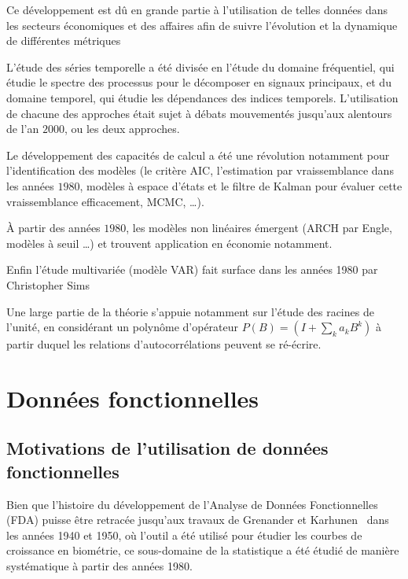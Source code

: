 Ce développement est dû en grande partie à l'utilisation de telles données dans les secteurs économiques et des affaires afin de suivre l'évolution et la dynamique de différentes métriques

L'étude des séries temporelle a été divisée en l'étude du domaine fréquentiel, qui étudie le spectre des processus pour le décomposer en signaux principaux, et du domaine temporel, qui étudie les dépendances des indices temporels. L'utilisation de chacune des approches était sujet à débats mouvementés jusqu'aux alentours de l'an $2000$, ou les deux approches. 

Le développement des capacités de calcul a été une révolution notamment pour l'identification des modèles (le critère AIC, l'estimation par vraissemblance dans les années $1980$, modèles à espace d'états et le filtre de Kalman pour évaluer cette vraissemblance efficacement, MCMC, \ldots).

À partir des années $1980$, les modèles non linéaires émergent (ARCH par Engle, modèles à seuil \ldots) et trouvent application en économie notamment.

Enfin l'étude multivariée (modèle VAR) fait surface dans les années 1980 par Christopher Sims~\cite[ \href{https://pubs.aeaweb.org/doi/pdf/10.1257/jep.15.4.101}{lien de l'article} ]{VAR_paper}

Une large partie de la théorie s'appuie notamment sur l'étude des racines de l'unité, en considérant un polynôme d'opérateur $P(B) = (I + \sum_k a_k B^k)$ à partir duquel les relations d'autocorrélations peuvent se ré-écrire.

\section{Données fonctionnelles}

\subsection{Motivations de l'utilisation de données fonctionnelles}



Bien que l'histoire du développement de l'Analyse de Données Fonctionnelles (FDA) puisse être retracée jusqu'aux travaux de Grenander et Karhunen~\cite{karhunen1946spektraltheorie} dans les années 1940 et 1950, où l'outil a été utilisé pour étudier les courbes de croissance en biométrie, ce sous-domaine de la statistique a été étudié de manière systématique à partir des années 1980.

